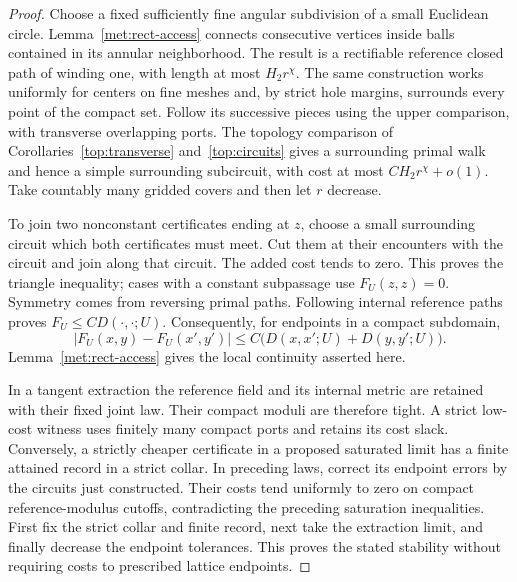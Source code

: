 \begin{proof}
Choose a fixed sufficiently fine angular subdivision of a small
Euclidean circle.  Lemma~\ref{met:rect-access} connects consecutive
vertices inside balls contained in its annular neighborhood.  The
result is a rectifiable reference closed path of winding one, with
length at most $H_2r^\chi$.  The same construction works uniformly for
centers on fine meshes and, by strict hole margins, surrounds every
point of the compact set.  Follow its successive pieces using the
upper comparison, with transverse overlapping ports.  The topology
comparison of Corollaries~\ref{top:transverse} and~\ref{top:circuits}
gives a surrounding primal walk and hence a simple
surrounding subcircuit, with cost at most
$CH_2r^\chi+o(1)$.  Take countably many gridded covers and then let
$r$ decrease.

To join two nonconstant certificates ending at $z$, choose a small
surrounding circuit which both certificates must meet.  Cut them at
their encounters with the circuit and join along that circuit.  The
added cost tends to zero.  This proves the triangle inequality; cases
with a constant subpassage use $F_U(z,z)=0$.  Symmetry comes from
reversing primal paths.  Following internal reference paths proves
$F_U\leq CD(\cdot,\cdot;U)$.  Consequently, for endpoints in a compact
subdomain,
\[
 |F_U(x,y)-F_U(x',y')|
 \leq C\bigl(D(x,x';U)+D(y,y';U)\bigr).
\]
Lemma~\ref{met:rect-access} gives the local continuity asserted here.

In a tangent extraction the reference field and its internal metric
are retained with their fixed joint law.  Their compact moduli are
therefore tight.  A strict low-cost witness uses finitely many compact
ports and retains its cost slack.  Conversely, a strictly cheaper
certificate in a proposed saturated limit has a finite attained
record in a strict collar.  In preceding laws, correct its endpoint
errors by the circuits just constructed.  Their costs tend uniformly
to zero on compact reference-modulus cutoffs, contradicting the
preceding saturation inequalities.  First fix the strict collar and
finite record, next take the extraction limit, and finally decrease
the endpoint tolerances.  This proves the stated stability without
requiring costs to prescribed lattice endpoints.
\end{proof}

